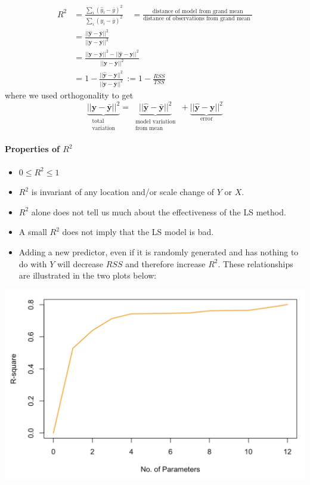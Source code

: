 \documentclass[
]{book}
\begin{document}
\begin{align*}
R^2 &=  \frac{\sum_i (\hat{y}_i - \bar{y})^2}{\sum_i (y_i - \bar{y})^2}\quad = \frac{\text{distance of model from grand mean}}{\text{distance of observations from grand mean }}\\ 
& =  \frac{||\hat{\mathbf{y}} - \bar{\mathbf{y}}||^2}{||\mathbf{y} - \bar{\mathbf{y}}||^2} \\
&= \frac{||\mathbf{y} - \bar{\mathbf{y}}||^2 - ||\hat{\mathbf{y}} - \mathbf{y}||^2  }{||\mathbf{y} - \bar{\mathbf{y}}||^2} \\
&= 1 - \frac{||\hat{\mathbf{y}} - \mathbf{y}||^2 }{||\mathbf{y} - \bar{\mathbf{y}}||^2}\, := 1 - \frac{RSS}{TSS}
\end{align*}
where we used orthogonality to get\\
\[\underbrace{||\mathbf{y} - \bar{\mathbf{y}}||^2}_{\substack{\text{ total}\\\text{ variation  }}} = \underbrace{||\hat{\mathbf{y}} - \bar{\mathbf{y}}||^2}_{\substack{\text{ model variation }\\ \text{ from mean }}} + \underbrace{|| \hat{\mathbf{y}} - \mathbf{y}||^2}_{\text{ error  }}\]

\paragraph*{\texorpdfstring{Properties of \(R^2\) }{Properties of R\^{}2 }}\label{properties-of-r2}

\begin{itemize}
\item
  \(0\leq R^2 \leq 1\)
\item
  \(R^2\) is invariant of any location and/or scale change of \(Y\) or \(X\).
\item
  \(R^2\) alone does not tell us much about the effectiveness of the LS method.
\item
  A small \(R^2\) does not imply that the LS model is bad.
\item
  Adding a new predictor, even if it is randomly generated and has nothing to do with \(Y\) will decrease \(RSS\) and therefore increase \(R^2\). These relationships are illustrated in the two plots below:
\end{itemize}

\begin{center}\includegraphics[width=0.6\linewidth]{images/week2/rsq} \end{center}
\end{document}
